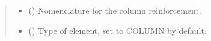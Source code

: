 \documentclass[a4paper,10pt,english]{sphinxmanual}
\begin{document}
\begin{fulllineitems}
\begin{quote}
\begin{description}
\begin{itemize}
\item {} 
\sphinxAtStartPar
{} () \textendash{} Nomenclature for the column reinforcement.

\item {} 
\sphinxAtStartPar
{} () \textendash{} Type of element, set to COLUMN by default.

\end{itemize}

\end{description}\end{quote}


\end{fulllineitems}
\end{document}

